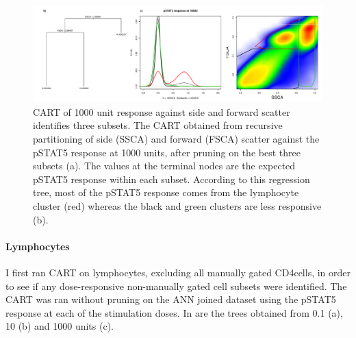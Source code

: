\begin{figure}[!h]
\centering
\includegraphics[scale=.5]{figures/pstat5-response-decision-tree}
{ CART of 1000 unit response against side and forward scatter identifies three subsets. }
{
    The \gls{CART} obtained from recursive partitioning of side (SSCA) and forward (FSCA) scatter against the pSTAT5 response at 1000 units,
after pruning on the best three subsets (a).
The values at the terminal nodes are the expected pSTAT5 response within each subset.
According to this regression tree, most of the pSTAT5 response comes from the lymphocyte cluster (red) whereas
the black and green clusters are less responsive (b).
} 
\end{figure}

\paragraph{Lymphocytes} 
I first ran CART on lymphocytes, excluding all manually gated CD4\positive cells, in order to see if any dose-responsive
non-manually gated cell subsets were identified.
The CART was ran without pruning on the ANN joined dataset using the pSTAT5 response at each of the stimulation doses.
In  are the trees obtained from 0.1 (a), 10 (b)
and 1000 units (c).

